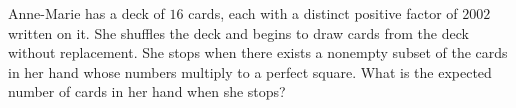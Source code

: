 Anne-Marie has a deck of $16$ cards, each with a distinct positive factor of $2002$ written on it. She shuffles the deck and begins to draw cards from the deck without replacement. She stops when there exists a nonempty subset of the cards in her hand whose numbers multiply to a perfect square. What is the expected number of cards in her hand when she stops?

